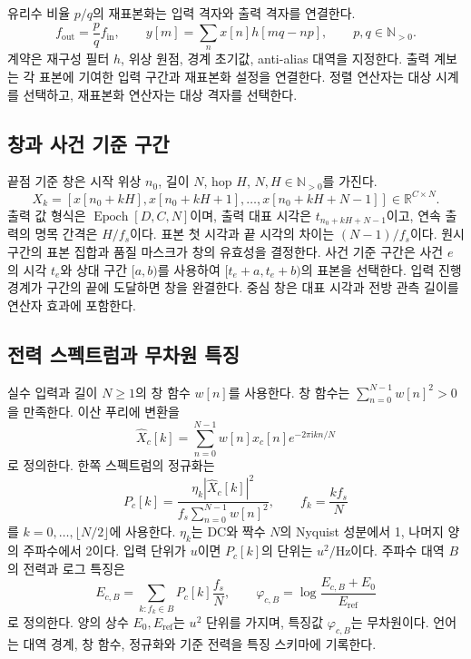 유리수 비율 $p/q$의 재표본화는 입력 격자와 출력 격자를 연결한다.
\begin{equation}
 f_{\mathrm{out}}=\frac pq f_{\mathrm{in}},\qquad
 y[m]=\sum_n x[n]h[mq-np],\qquad p,q\in\mathbb N_{>0}.
 \label{eq:resample}
\end{equation}
계약은 재구성 필터 $h$, 위상 원점, 경계 초기값, anti-alias 대역을 지정한다.
출력 계보는 각 표본에 기여한 입력 구간과 재표본화 설정을 연결한다.
정렬 연산자는 대상 시계를 선택하고, 재표본화 연산자는 대상 격자를 선택한다.

\subsection{창과 사건 기준 구간}
끝점 기준 창은 시작 위상 $n_0$, 길이 $N$, hop $H$, $N,H\in\mathbb N_{>0}$를 가진다.
\begin{equation}
 X_k=[x[n_0+kH],x[n_0+kH+1],\ldots,x[n_0+kH+N-1]]
      \in\mathbb R^{C\times N}.
 \label{eq:window}
\end{equation}
출력 값 형식은 $\operatorname{Epoch}[D,C,N]$이며,
출력 대표 시각은 $t_{n_0+kH+N-1}$이고, 연속 출력의 명목 간격은 $H/f_s$이다.
표본 첫 시각과 끝 시각의 차이는 $(N-1)/f_s$이다.
원시 구간의 표본 집합과 품질 마스크가 창의 유효성을 결정한다.
사건 기준 구간은 사건 $e$의 시각 $t_e$와 상대 구간 $[a,b)$를 사용하여
$[t_e+a,t_e+b)$의 표본을 선택한다. 입력 진행 경계가 구간의 끝에 도달하면 창을 완결한다.
중심 창은 대표 시각과 전방 관측 길이를 연산자 효과에 포함한다.

\subsection{전력 스펙트럼과 무차원 특징}
실수 입력과 길이 $N\ge1$의 창 함수 $w[n]$를 사용한다.
창 함수는 $\sum_{n=0}^{N-1}w[n]^2>0$을 만족한다.
이산 푸리에 변환을
\begin{equation}
 \widehat X_c[k]=\sum_{n=0}^{N-1}w[n]x_c[n]
                 e^{-2\pi\mathrm{i}kn/N}
\end{equation}
로 정의한다. 한쪽 스펙트럼의 정규화는
\begin{equation}
 P_c[k]=\frac{\eta_k|\widehat X_c[k]|^2}
                  {f_s\sum_{n=0}^{N-1}w[n]^2},\qquad
 f_k=\frac{kf_s}{N}
 \label{eq:psd}
\end{equation}
를 $k=0,\ldots,\lfloor N/2\rfloor$에 사용한다.
$\eta_k$는 DC와 짝수 $N$의 Nyquist 성분에서 1, 나머지 양의 주파수에서 2이다.
입력 단위가 $u$이면 $P_c[k]$의 단위는 $u^2/\mathrm{Hz}$이다.
주파수 대역 $B$의 전력과 로그 특징은
\begin{equation}
 E_{c,B}=\sum_{k:f_k\in B}P_c[k]\frac{f_s}{N},\qquad
 \varphi_{c,B}=\log\frac{E_{c,B}+E_0}{E_{\mathrm{ref}}}
\end{equation}
로 정의한다. 양의 상수 $E_0,E_{\mathrm{ref}}$는 $u^2$ 단위를 가지며,
특징값 $\varphi_{c,B}$는 무차원이다. 언어는 대역 경계, 창 함수, 정규화와 기준 전력을
특징 스키마에 기록한다.

